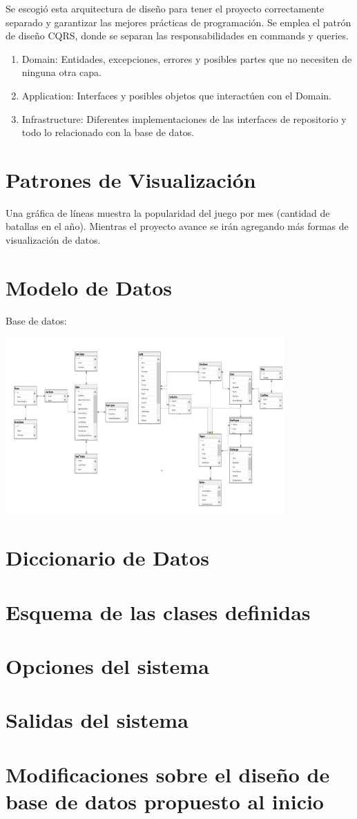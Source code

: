 \documentclass[15pt,a4paper]{article}
\begin{document}
Se escogió esta arquitectura de diseño para tener el proyecto correctamente separado y 
garantizar las mejores prácticas de programación. Se emplea el patrón de diseño CQRS, 
donde se separan las responsabilidades en commands y queries.
\begin{enumerate}
\item Domain: Entidades, excepciones, errores y posibles partes que no necesiten de ninguna 
otra capa.
\item Application: Interfaces y posibles objetos que interactúen con el Domain.
\item Infrastructure: Diferentes implementaciones de las interfaces de repositorio y todo lo 
relacionado con la base de datos.
\end{enumerate}

\section{Patrones de Visualización}
Una gráfica de líneas muestra la popularidad del juego por mes (cantidad de batallas en 
el año). Mientras el proyecto avance se irán agregando más formas de visualización de 
datos.

\section{Modelo de Datos}
Base de datos:
\begin{center}
\includegraphics[width=0.8\textwidth]{bd}
\end{center}

\section{Diccionario de Datos}


\section{Esquema de las clases definidas}

\section{Opciones del sistema}

\section{Salidas del sistema}

\section{Modificaciones sobre el diseño de base de datos propuesto al inicio}
\end{document}
